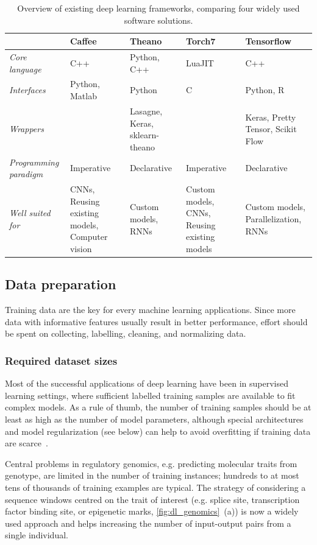 \begin{table}
\centering
\begin{tabular}{p{2.5cm}|p{2.6cm}|p{2.6cm}|p{2.6cm}|p{2.6cm}}
\toprule
& \textbf{Caffee} & \textbf{Theano} & \textbf{Torch7} & \textbf{Tensorflow} \\
\hline
\textit{Core language} & C++ & Python, C++ & LuaJIT  & C++\\
\hline
\textit{Interfaces} & Python, Matlab & Python & C & Python, R \\
\hline
\textit{Wrappers} & & Lasagne, Keras, sklearn-theano & & Keras, Pretty Tensor, Scikit Flow \\
\hline
\textit{Programming paradigm} & Imperative & Declarative & Imperative & Declarative \\
\hline
\textit{Well suited for} & CNNs, Reusing existing models, Computer vision & Custom models, RNNs & Custom models, CNNs, Reusing existing models & Custom models, Parallelization, RNNs \\
\bottomrule
\end{tabular}
\caption{Overview of existing deep learning frameworks, comparing four widely used software solutions.}
\label{tab:dl_tools}
\end{table}


\subsection{Data preparation}

Training data are the key for every machine learning applications. Since more data with informative features usually result in better performance, effort should be spent on collecting, labelling, cleaning, and normalizing data.

\subsubsection{Required dataset sizes}
Most of the successful applications of deep learning have been in supervised learning settings, where sufficient labelled training samples are available to fit complex models. As a rule of thumb, the number of training samples should be at least as high as the number of model parameters, although special architectures and model regularization (see below) can help to avoid overfitting if training data are scarce~\citep{bengio_practical_2012}.

Central problems in regulatory genomics, e.g. predicting molecular traits from genotype, are limited in the number of training instances; hundreds to at most tens of thousands of training examples are typical. The strategy of considering a sequence windows centred on the trait of interest (e.g. splice site, transcription factor binding site, or epigenetic marks, \autoref{fig:dl_genomics}~(a)) is now a widely used approach and helps increasing the number of input-output pairs from a single individual.

